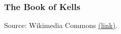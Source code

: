 \begin{frame}
\frametitle{The Book of Kells}
\begin{center}
\vspace{-1em}
\end{center}
\vspace{-1em}
\hfill\footnotesize{Source: Wikimedia Commons
\href{https://commons.wikimedia.org/wiki/File:KellsFol309r.jpg}{(link)}.}
\end{frame}


